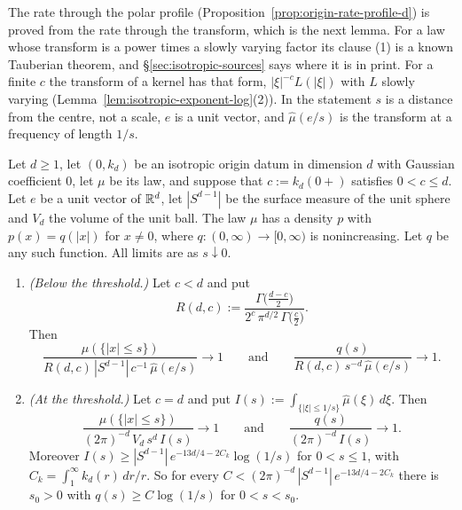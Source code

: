 The rate through the polar profile (Proposition~\ref{prop:origin-rate-profile-d}) is proved
from the rate through the transform, which is the next lemma. For a law whose transform is a
power times a slowly varying factor its clause (1) is a known Tauberian theorem, and
\S\ref{sec:isotropic-sources} says where it is in print. For a finite $c$ the transform of a
kernel has that form, $|\xi|^{-c}L(|\xi|)$ with $L$ slowly varying
(Lemma~\ref{lem:isotropic-exponent-log}(2)). In the statement $s$ is a distance from the
centre, not a scale, $e$ is a unit vector, and $\widehat\mu(e/s)$ is the transform at a
frequency of length $1/s$.

\begin{lemma}\label{prop:origin-rate-d}
Let $d \ge 1$, let $(0, k_d)$ be an isotropic origin datum in dimension $d$ with Gaussian
coefficient $0$, let $\mu$ be its law, and suppose that $c := k_d(0{+})$ satisfies $0 < c \le d$.
Let $e$ be a unit vector of $\mathbb{R}^d$, let $|S^{d-1}|$ be the surface measure of the unit sphere and
$V_d$ the volume of the unit ball. The law $\mu$ has a density $p$ with $p(x) = q(|x|)$ for
$x \ne 0$, where $q : (0,\infty) \to [0,\infty)$ is nonincreasing. Let $q$ be any such function.
All limits are as $s \downarrow 0$.
\begin{enumerate}
\item \emph{(Below the threshold.)} Let $c < d$ and put
\[
  R(d,c) := \frac{\Gamma\bigl(\tfrac{d-c}{2}\bigr)}{2^{c}\,\pi^{d/2}\,\Gamma\bigl(\tfrac c2\bigr)} .
\]
Then
\[
  \frac{\mu(\{|x| \le s\})}{R(d,c)\,|S^{d-1}|\,c^{-1}\,\widehat\mu(e/s)} \to 1
  \qquad\text{and}\qquad
  \frac{q(s)}{R(d,c)\,s^{-d}\,\widehat\mu(e/s)} \to 1 .
\]
\item \emph{(At the threshold.)} Let $c = d$ and put
$I(s) := \int_{\{|\xi| \le 1/s\}}\widehat\mu(\xi)\,d\xi$. Then
\[
  \frac{\mu(\{|x| \le s\})}{(2\pi)^{-d}\,V_d\,s^{d}\,I(s)} \to 1
  \qquad\text{and}\qquad
  \frac{q(s)}{(2\pi)^{-d}\,I(s)} \to 1 .
\]
Moreover $I(s) \ge |S^{d-1}|\,e^{-13d/4 - 2C_k}\log(1/s)$ for $0 < s \le 1$, with
$C_k = \int_1^\infty k_d(r)\,dr/r$. So for every
$C < (2\pi)^{-d}\,|S^{d-1}|\,e^{-13d/4 - 2C_k}$ there is $s_0 > 0$ with
$q(s) \ge C\log(1/s)$ for $0 < s < s_0$.
\end{enumerate}
\end{lemma}

